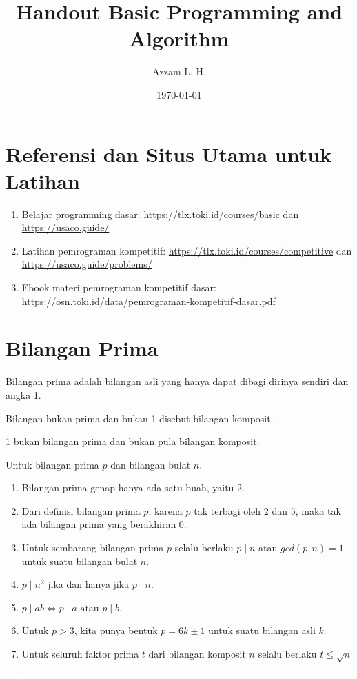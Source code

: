 
	\title{Handout Basic Programming and Algorithm} %
	\date{\today}
	\author{Azzam L. H.}
	\maketitle

 \renewcommand*\contentsname{Daftar Isi}
\tableofcontents
	\noindent
	\section{Referensi dan Situs Utama untuk Latihan}
	\begin{enumerate}
	\item Belajar programming dasar:           \url{https://tlx.toki.id/courses/basic} dan \url{https://usaco.guide/}
	\item Latihan pemrograman kompetitif: \url{https://tlx.toki.id/courses/competitive} dan \url{https://usaco.guide/problems/}
	\item Ebook materi pemrograman kompetitif dasar: \url{https://osn.toki.id/data/pemrograman-kompetitif-dasar.pdf}
	\end{enumerate}
	
	
	
	\section{Bilangan Prima}
	Bilangan prima adalah bilangan asli yang hanya dapat dibagi dirinya sendiri dan angka 1. 
	    
	 Bilangan bukan prima dan bukan 1 disebut bilangan komposit.
	 
	 1 bukan bilangan prima dan bukan pula bilangan komposit. 
	 
	 Untuk bilangan prima $p$ dan bilangan bulat $n$.
	 \begin{enumerate}
	     \item Bilangan prima genap hanya ada satu buah, yaitu 2.
	     \item Dari definisi bilangan prima $p$, karena $p$ tak terbagi oleh $2$ dan $5$, maka tak ada bilangan prima yang berakhiran $0$.
	     \item Untuk sembarang bilangan prima $p$ selalu berlaku $p \mid n$ atau $gcd(p,n)=1$ untuk suatu bilangan bulat $n$.
	     \item $p \mid n^2$ jika dan hanya jika $p \mid n$.
	     \item $p \mid ab \iff p \mid a \text{ atau } p \mid b$.
	     \item Untuk $p > 3$, kita punya bentuk $p = 6k \pm 1$ untuk suatu bilangan asli $k$.
	     \item Untuk seluruh faktor prima $t$ dari bilangan komposit $n$ selalu berlaku $t \le \sqrt{n}$.
	  \end{enumerate}
	  
